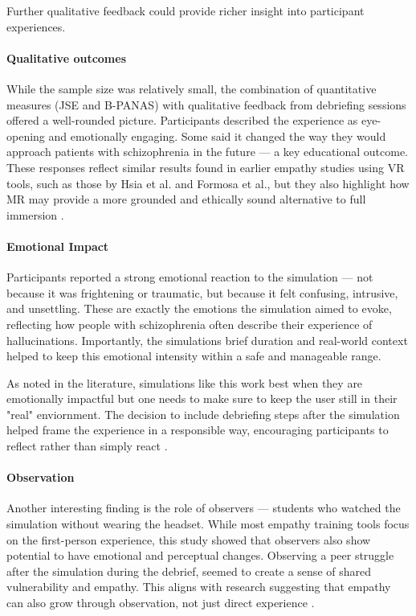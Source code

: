 Further qualitative feedback could provide richer insight into participant experiences.


\paragraph{Qualitative outcomes}
While the sample size was relatively small, the combination of quantitative measures (JSE and B-PANAS) with qualitative feedback from debriefing sessions offered a well-rounded picture. Participants described the experience as eye-opening and emotionally engaging. Some said it changed the way they would approach patients with schizophrenia in the future — a key educational outcome. These responses reflect similar results found in earlier empathy studies using VR tools, such as those by Hsia et al. and Formosa et al., but they also highlight how MR may provide a more grounded and ethically sound alternative to full immersion \cite{Hsia2022, Formosa2018}.

\paragraph{Emotional Impact}

Participants reported a strong emotional reaction to the simulation — not because it was frightening or traumatic, but because it felt confusing, intrusive, and unsettling. These are exactly the emotions the simulation aimed to evoke, reflecting how people with schizophrenia often describe their experience of hallucinations. Importantly, the simulations brief duration and real-world context helped to keep this emotional intensity within a safe and manageable range.

\vspace{1em}

As noted in the literature, simulations like this work best when they are emotionally impactful but one needs to make sure to keep the user still in their "real" enviornment. The decision to include debriefing steps after the simulation helped frame the experience in a responsible way, encouraging participants to reflect rather than simply react \cite{Rueda2020, Ando2011}.

\paragraph{Observation}

Another interesting finding is the role of observers — students who watched the simulation without wearing the headset. While most empathy training tools focus on the first-person experience, this study showed that observers also show potential to have  emotional and perceptual changes. Observing a peer struggle after the simulation during the debrief, seemed to create a sense of shared vulnerability and empathy. This aligns with research suggesting that empathy can also grow through observation, not just direct experience \cite{Formosa2018}.
\vspace{1em}

